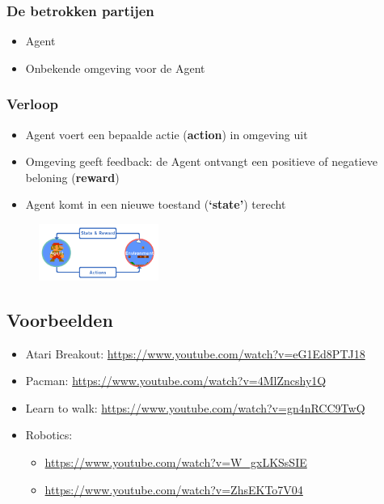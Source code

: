 \documentclass{article}
\begin{document}
\subsubsection{De betrokken partijen}

\begin{itemize}
    \item Agent
    \item Onbekende omgeving voor de Agent
\end{itemize}

\subsubsection{Verloop}

\begin{itemize}
    \item Agent voert een bepaalde actie (\textbf{action}) in omgeving uit
    \item Omgeving geeft feedback: de Agent ontvangt een positieve of negatieve beloning (\textbf{reward})
    \item Agent komt in een nieuwe toestand (\textbf{`state'}) terecht
\end{itemize}

\begin{figure}[H]
    \centering
    \includegraphics[width=0.35\textwidth]{reinforcement-learning2.png}
\end{figure}

\subsection{Voorbeelden}

\begin{itemize}
    \item Atari Breakout: \url{https://www.youtube.com/watch?v=eG1Ed8PTJ18}
    \item Pacman: \url{https://www.youtube.com/watch?v=4MlZncshy1Q}    
    \item Learn to walk: \url{https://www.youtube.com/watch?v=gn4nRCC9TwQ}
    \item Robotics:
    \begin{itemize}
        \item \url{https://www.youtube.com/watch?v=W_gxLKSsSIE}
        \item \url{https://www.youtube.com/watch?v=ZhsEKTo7V04}
    \end{itemize}
\end{itemize}
\end{document}
